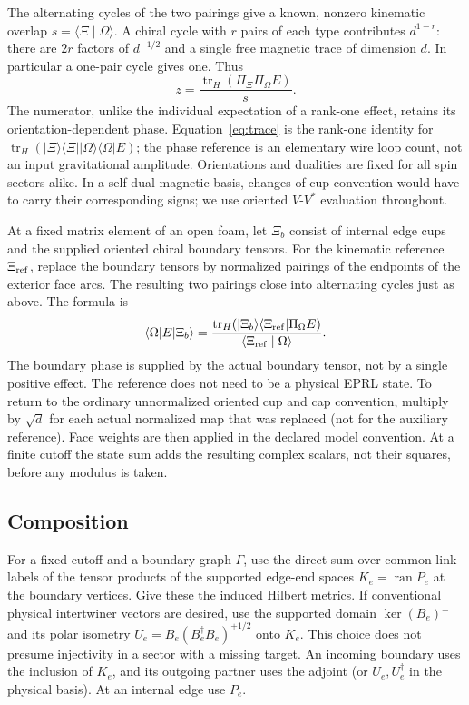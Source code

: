 \documentclass[11pt]{article}
\theoremstyle{remark}
\DeclareMathOperator{\tr}{tr}
\newcommand{\pket}[1]{\lvert #1\rangle}
\newcommand{\pbra}[1]{\langle #1\rvert}
\newcommand{\braket}[2]{\langle #1 \mid #2 \rangle}
\newcommand{\proj}[1]{\pket{#1}\pbra{#1}}
\begin{document}
The alternating cycles of the two pairings give a known, nonzero kinematic overlap \(s=\braket{\Xi}{\Omega}\). A chiral cycle with \(r\) pairs of each type contributes \(d^{1-r}\): there are \(2r\) factors of \(d^{-1/2}\) and a single free magnetic trace of dimension \(d\). In particular a one-pair cycle gives one. Thus
\begin{equation}\label{eq:trace}
 z=\frac{\tr_H(\Pi_\Xi\Pi_\Omega E)}{s}.
\end{equation}
The numerator, unlike the individual expectation of a rank-one effect, retains its orientation-dependent phase. Equation~\eqref{eq:trace} is the rank-one identity for \(\tr_H(\proj{\Xi}\proj{\Omega}E)\); the phase reference is an elementary wire loop count, not an input gravitational amplitude. Orientations and dualities are fixed for all spin sectors alike. In a self-dual magnetic basis, changes of cup convention would have to carry their corresponding signs; we use oriented \(V\)-\(V^*\) evaluation throughout.

At a fixed matrix element of an open foam, let \(\Xi_b\) consist of internal edge cups and the supplied oriented chiral boundary tensors. For the kinematic reference \(\Xi_{\rm ref}\), replace the boundary tensors by normalized pairings of the endpoints of the exterior face arcs. The resulting two pairings close into alternating cycles just as above. The formula is
\begin{equation}\label{eq:open-trace}
 \pbra{\Omega}E\pket{\Xi_b}
 =\frac{\tr_H(\pket{\Xi_b}\pbra{\Xi_{\rm ref}}\Pi_\Omega E)}
             {\braket{\Xi_{\rm ref}}{\Omega}}.
\end{equation}
The boundary phase is supplied by the actual boundary tensor, not by a single positive effect. The reference does not need to be a physical EPRL state. To return to the ordinary unnormalized oriented cup and cap convention, multiply by \(\sqrt d\) for each actual normalized map that was replaced (not for the auxiliary reference). Face weights are then applied in the declared model convention. At a finite cutoff the state sum adds the resulting complex scalars, not their squares, before any modulus is taken.

\subsection{Composition}

For a fixed cutoff and a boundary graph \(\Gamma\), use the direct sum over common link labels of the tensor products of the supported edge-end spaces \(K_e=\operatorname{ran}P_e\) at the boundary vertices. Give these the induced Hilbert metrics. If conventional physical intertwiner vectors are desired, use the supported domain \(\ker(B_e)^\perp\) and its polar isometry \(U_e=B_e(B_e^\dagger B_e)^{+1/2}\) onto \(K_e\). This choice does not presume injectivity in a sector with a missing target. An incoming boundary uses the inclusion of \(K_e\), and its outgoing partner uses the adjoint (or \(U_e,U_e^\dagger\) in the physical basis). At an internal edge use \(P_e\).
\end{document}

